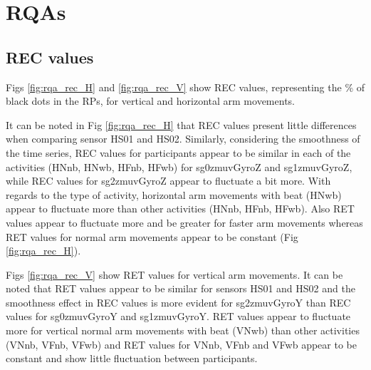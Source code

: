 \newpage
\section{RQAs} \label{appendix:d:rpas}
\subsection{REC values}
Figs \ref{fig:rqa_rec_H} and \ref{fig:rqa_rec_V} show REC values,
representing the \% of black dots in the RPs, for vertical and horizontal 
arm movements.

It can be noted in Fig \ref{fig:rqa_rec_H} that REC values present 
little differences when comparing sensor HS01 and HS02. 
Similarly, considering the smoothness of the time series, REC values for 
participants appear to be similar in each of the activities 
(HNnb, HNwb, HFnb, HFwb) for sg0zmuvGyroZ and sg1zmuvGyroZ, 
while REC values for sg2zmuvGyroZ appear to fluctuate a bit more.
With regards to the type of activity, horizontal arm movements with beat 
(HNwb) appear to fluctuate more than other activities (HNnb, HFnb, HFwb). 
Also RET values appear to fluctuate more and be greater for faster
arm movements whereas RET values for normal arm movements appear 
to be constant (Fig \ref{fig:rqa_rec_H}).

Figs \ref{fig:rqa_rec_V} show RET values for vertical arm movements.
It can be noted that RET values appear to be similar for sensors HS01 and HS02
and the smoothness effect in REC values is more evident for sg2zmuvGyroY 
than REC values for sg0zmuvGyroY and sg1zmuvGyroY.
RET values appear to fluctuate more for vertical normal arm movements with 
beat (VNwb) than other activities (VNnb, VFnb, VFwb) and  RET values for 
VNnb, VFnb and VFwb appear to be constant and show little fluctuation 
between participants.




